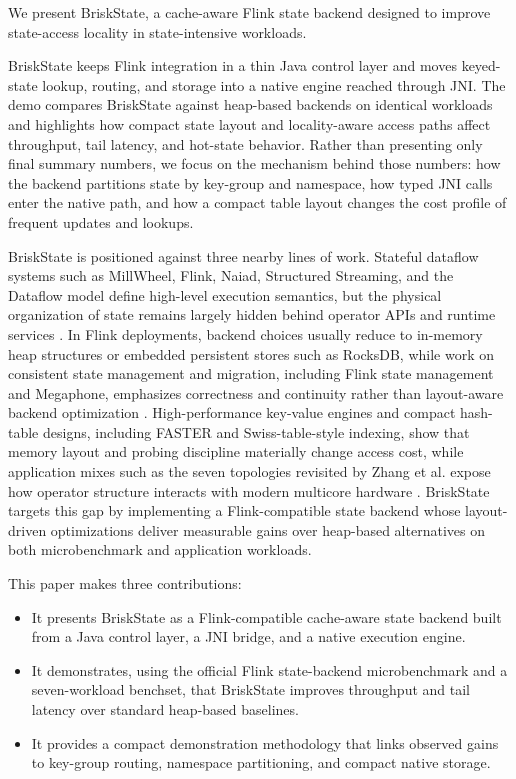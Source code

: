 \documentclass[sigconf,nonacm]{acmart}
\newcommand{\briskstate}{BriskState\xspace}
\begin{document}
We present \briskstate, a cache-aware Flink state backend designed to improve state-access locality in state-intensive workloads.

\briskstate keeps Flink integration in a thin Java control layer and moves keyed-state lookup, routing, and storage into a native engine reached through JNI. The demo compares BriskState against heap-based backends on identical workloads and highlights how compact state layout and locality-aware access paths affect throughput, tail latency, and hot-state behavior. Rather than presenting only final summary numbers, we focus on the mechanism behind those numbers: how the backend partitions state by key-group and namespace, how typed JNI calls enter the native path, and how a compact table layout changes the cost profile of frequent updates and lookups.

\briskstate is positioned against three nearby lines of work. Stateful dataflow systems such as MillWheel, Flink, Naiad, Structured Streaming, and the Dataflow model define high-level execution semantics, but the physical organization of state remains largely hidden behind operator APIs and runtime services \cite{akidau2013millwheel,carbone2015flink,murray2013naiad,armbrust2018structured,akidau2015dataflow}. In Flink deployments, backend choices usually reduce to in-memory heap structures or embedded persistent stores such as RocksDB, while work on consistent state management and migration, including Flink state management and Megaphone, emphasizes correctness and continuity rather than layout-aware backend optimization \cite{carbone2015flink,rocksdb,carbone2017statemanagement,hoffman2019megaphone}. High-performance key-value engines and compact hash-table designs, including FASTER and Swiss-table-style indexing, show that memory layout and probing discipline materially change access cost, while application mixes such as the seven topologies revisited by Zhang et al. expose how operator structure interacts with modern multicore hardware \cite{chandramouli2018faster,abseil2018swisstable,zhang2017revisiting}. \briskstate targets this gap by implementing a Flink-compatible state backend whose layout-driven optimizations deliver measurable gains over heap-based alternatives on both microbenchmark and application workloads.

This paper makes three contributions:
\begin{itemize}
  \item It presents \briskstate as a Flink-compatible cache-aware state backend built from a Java control layer, a JNI bridge, and a native execution engine.
  \item It demonstrates, using the official Flink state-backend microbenchmark and a seven-workload benchset, that \briskstate improves throughput and tail latency over standard heap-based baselines.
  \item It provides a compact demonstration methodology that links observed gains to key-group routing, namespace partitioning, and compact native storage.
\end{itemize}
\end{document}
